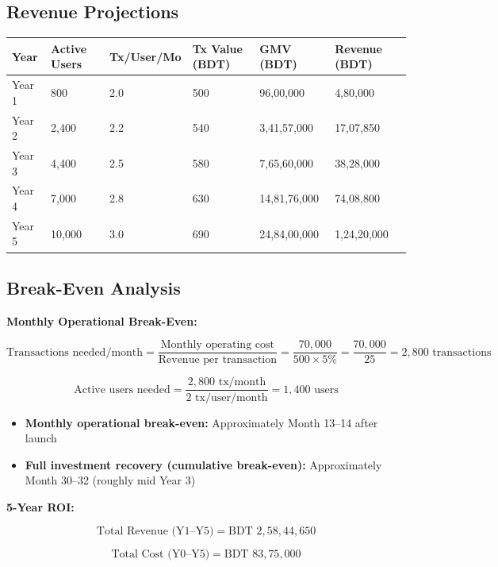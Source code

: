 \documentclass[a4paper,12pt]{article}
\begin{document}
\subsection{Revenue Projections}

\begin{table}[H]
\centering
\small
\begin{tabular}{|l|l|l|l|l|l|}
\hline
\textbf{Year} & \textbf{Active Users} & \textbf{Tx/User/Mo} & \textbf{Tx Value (BDT)} & \textbf{GMV (BDT)} & \textbf{Revenue (BDT)} \\
\hline
Year 1 & 800 & 2.0 & 500 & 96,00,000 & 4,80,000 \\
Year 2 & 2,400 & 2.2 & 540 & 3,41,57,000 & 17,07,850 \\
Year 3 & 4,400 & 2.5 & 580 & 7,65,60,000 & 38,28,000 \\
Year 4 & 7,000 & 2.8 & 630 & 14,81,76,000 & 74,08,800 \\
Year 5 & 10,000 & 3.0 & 690 & 24,84,00,000 & 1,24,20,000 \\
\hline
\end{tabular}
\end{table}

\subsection{Break-Even Analysis}

\textbf{Monthly Operational Break-Even:}

\[
\text{Transactions needed/month} = \frac{\text{Monthly operating cost}}{\text{Revenue per transaction}} = \frac{70,000}{500 \times 5\%} = \frac{70,000}{25} = 2,800 \text{ transactions}
\]

\[
\text{Active users needed} = \frac{2,800 \text{ tx/month}}{2 \text{ tx/user/month}} = 1,400 \text{ users}
\]

\begin{itemize}
    \item \textbf{Monthly operational break-even:} Approximately Month 13--14 after launch
    \item \textbf{Full investment recovery (cumulative break-even):} Approximately Month 30--32 (roughly mid Year 3)
\end{itemize}

\textbf{5-Year ROI:}

\[
\text{Total Revenue (Y1--Y5)} = \text{BDT } 2,58,44,650
\]

\[
\text{Total Cost (Y0--Y5)} = \text{BDT } 83,75,000
\]
\end{document}
